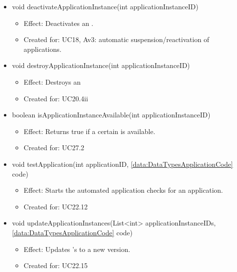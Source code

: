 \begin{description}
\begin{itemize}[noitemsep,nolistsep,leftmargin=-.25cm]
\begin{itemize}
        \end{itemize}
      \item \textsf{void deactivateApplicationInstance(int applicationInstanceID)}
        \begin{itemize}[noitemsep,nolistsep]
           \item Effect: Deactivates an .
\item Created for: UC18, Av3: automatic suspension/reactivation of applications.
        \end{itemize}
      \item \textsf{void destroyApplicationInstance(int applicationInstanceID)}
        \begin{itemize}[noitemsep,nolistsep]
           \item Effect: Destroys an 
\item Created for: UC20.4ii
        \end{itemize}
      \item \textsf{boolean isApplicationInstanceAvailable(int applicationInstanceID)}
        \begin{itemize}[noitemsep,nolistsep]
           \item Effect: Returns true if a certain  is available.
\item Created for: UC27.2
        \end{itemize}
      \item \textsf{void testApplication(int applicationID, \ref{data:DataTypesApplicationCode} code)}
        \begin{itemize}[noitemsep,nolistsep]
           \item Effect: Starts the automated application checks for an application.
\item Created for: UC22.12
        \end{itemize}
      \item \textsf{void updateApplicationInstances(List\textless{}int\textgreater{} applicationInstanceIDs, \ref{data:DataTypesApplicationCode} code)}
        \begin{itemize}[noitemsep,nolistsep]
           \item Effect: Updates 's to a new version.
\item Created for: UC22.15
        \end{itemize}
    \end{itemize}
    \end{description}

